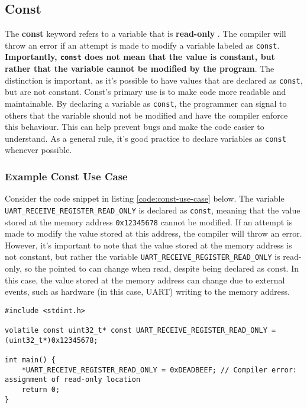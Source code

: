 \documentclass[main.tex]{subfiles}
\begin{document}
\subsection{Const}
The \textbf{const} keyword refers to a variable that is \textbf{read-only} \cite{beningoConst}. The compiler will throw an error if an attempt is made to modify a variable labeled as \texttt{const}. \textbf{Importantly, \texttt{const} does not mean that the value is constant, but rather that the variable cannot be modified by the program}. The distinction is important, as it's possible to have values that are declared as \texttt{const}, but are not constant. 
\newline
\newline
\noindent Const's primary use is to make code more readable and maintainable. By declaring a variable as \texttt{const}, the programmer can signal to others that the variable should not be modified and have the compiler enforce this behaviour. This can help prevent bugs and make the code easier to understand. As a general rule, it's good practice to declare variables as \texttt{const} whenever possible.

\subsubsection{Example Const Use Case}
Consider the code snippet in listing \ref{code:const-use-case} below. The variable \texttt{UART\_RECEIVE\_REGISTER\_READ\_ONLY} is declared as \texttt{const}, meaning that the value stored at the memory address \texttt{0x12345678} cannot be modified. If an attempt is made to modify the value stored at this address, the compiler will throw an error. However, it's important to note that the value stored at the memory address is not constant, but rather the variable \texttt{UART\_RECEIVE\_REGISTER\_READ\_ONLY} is read-only, so the pointed to can change when read, despite being declared as const. In this case, the value stored at the memory address can change due to external events, such as hardware (in this case, UART) writing to the memory address.

\begin{lstlisting}[caption={Example use case of Const}, label={code:const-use-case}]
#include <stdint.h>

volatile const uint32_t* const UART_RECEIVE_REGISTER_READ_ONLY = (uint32_t*)0x12345678;

int main() {
    *UART_RECEIVE_REGISTER_READ_ONLY = 0xDEADBEEF; // Compiler error: assignment of read-only location
    return 0;
}
\end{lstlisting}
\end{document}
